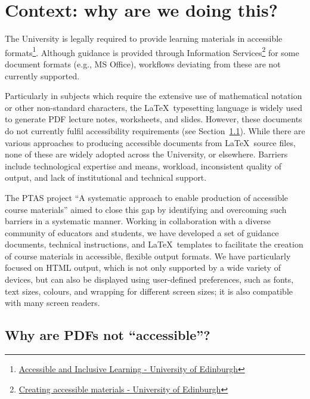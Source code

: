 \section{Context: why are we doing this?}\label{sec:context}

The University is legally required to provide learning materials in accessible formats\footnote{\href{https://institute-academic-development.ed.ac.uk/learning-teaching/staff/accessible}{Accessible and Inclusive Learning - University of Edinburgh}}. Although guidance is provided through Information Services\footnote{\href{https://www.ed.ac.uk/information-services/help-consultancy/accessibility/creating-materials}{Creating accessible materials - University of Edinburgh}} for some document formats (e.g., MS Office), workflows deviating from these are not currently supported.

Particularly in subjects which require the extensive use of mathematical notation or other non-standard characters, the \LaTeX\ typesetting language is widely used to generate PDF lecture notes, worksheets, and slides. However, these documents do not currently fulfil accessibility requirements (see Section~\ref{sec:context:PDF}). While there are various approaches to producing accessible documents from \LaTeX\ source files, none of these are widely adopted across the University, or elsewhere. Barriers include technological expertise and means, workload, inconsistent quality of output, and lack of institutional and technical support.

The PTAS project ``A systematic approach to enable production of accessible course materials'' aimed to close this gap by identifying and overcoming such barriers in a systematic manner. Working in collaboration with a diverse community of educators and students, we have developed a set of guidance documents, technical instructions, and \LaTeX\ templates to facilitate the creation of course materials in accessible, flexible output formats.  We have particularly focused on HTML output, which is not only supported by a wide variety of devices, but can also be displayed using user-defined preferences, such as fonts, text sizes, colours, and wrapping for different screen sizes; it is also compatible with many screen readers.


\subsection{Why are PDFs not ``accessible''?}
\label{sec:context:PDF}

